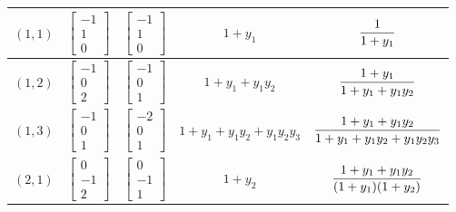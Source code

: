 \documentclass[10pt,a4paper]{amsart}
\numberwithin{equation}{section}
\begin{document}
\begin{Example}
\begin{table}[t!]
\begin{tabular}{c|c|c|c|c}
\hline
$(1,1)$ & $\begin{bmatrix}-1\\[-1ex]1\\[-1ex]0 \end{bmatrix}$ & $\begin{bmatrix}-1\\[-1ex]1\\[-1ex]0 \end{bmatrix}$ & $1+y_1$&$\dfrac{1}{1+y_1}\vphantom{\begin{bmatrix}1\\[-.5ex]0\\[-.5ex]0 \end{bmatrix}}$\\
\hline
$(1,2)$ & $\begin{bmatrix}-1\\[-1ex]0\\[-1ex]2 \end{bmatrix}$ & $\begin{bmatrix}-1\\[-1ex]0\\[-1ex]1 \end{bmatrix}$ & $1+y_1+y_1y_2$ & $\dfrac{1+y_1}{1+y_1+y_1y_2}\vphantom{\begin{bmatrix}1\\[-.5ex]0\\[-.5ex]0 \end{bmatrix}}$\\
\hline
$(1,3)$ & $\begin{bmatrix}-1\\[-1ex]0\\[-1ex]1 \end{bmatrix}$ & $\begin{bmatrix}-2\\[-1ex]0\\[-1ex]1 \end{bmatrix}$ & $1+y_1+y_1y_2+y_1y_2y_3$ & $\dfrac{1+y_1+y_1y_2}{1+y_1+y_1y_2+y_1y_2y_3}\vphantom{\begin{bmatrix}1\\[-.5ex]0\\[-.5ex]0 \end{bmatrix}}$\\
\hline
$(2,1)$ & $\begin{bmatrix}0\\[-1ex]-1\\[-1ex]2 \end{bmatrix}$& $\begin{bmatrix}0\\[-1ex]-1\\[-1ex]1 \end{bmatrix}$&$1+y_2$ & $\dfrac{1+y_1+y_1y_2}{(1+y_1)(1+y_2)}\vphantom{\begin{bmatrix}1\\[-.5ex]0\\[-.5ex]0 \end{bmatrix}}$\\

\end{tabular}
\end{table}
\end{Example}
\end{document}
